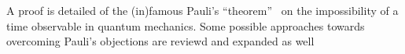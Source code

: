 A proof is detailed of the (in)famous Pauli's ``theorem''~\parencite{PauliFootnote}
on the impossibility of a time observable in quantum mechanics. Some possible
approaches towards overcoming Pauli's objections are reviewd and expanded as well

